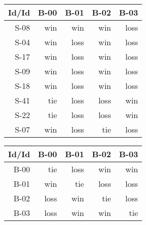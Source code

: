 \begin{tabular}{ | r | r | r | r | r | }
    \hline
        Id/Id  &   B-00  &   B-01  &   B-02  &   B-03  \\
    \hline
    \hline
         S-08  &    win  &    win  &    win  &   loss  \\
    \hline
         S-04  &    win  &   loss  &    win  &   loss  \\
    \hline
         S-17  &    win  &   loss  &    win  &   loss  \\
    \hline
         S-09  &    win  &   loss  &    win  &   loss  \\
    \hline
         S-18  &    win  &   loss  &    win  &   loss  \\
    \hline
         S-41  &    tie  &   loss  &   loss  &    win  \\
    \hline
         S-22  &    tie  &   loss  &   loss  &    win  \\
    \hline
         S-07  &    win  &   loss  &    tie  &   loss  \\
    \hline
\end{tabular}


\begin{tabular}{ | r | r | r | r | r | }
    \hline
        Id/Id  &   B-00  &   B-01  &   B-02  &   B-03  \\
    \hline
    \hline
         B-00  &    tie  &   loss  &    win  &    win  \\
    \hline
         B-01  &    win  &    tie  &   loss  &   loss  \\
    \hline
         B-02  &   loss  &    win  &    tie  &   loss  \\
    \hline
         B-03  &   loss  &    win  &    win  &    tie  \\
    \hline
\end{tabular}




